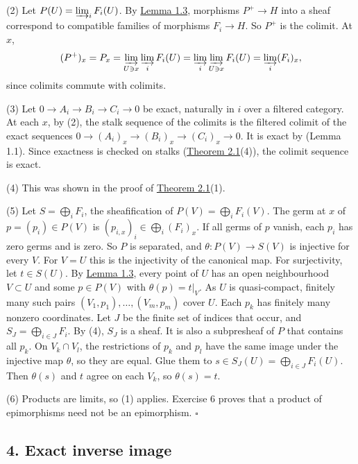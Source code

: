 \documentclass[
  english,
  11pt,
  a4paper,
]{article}
\begin{document}
(2) Let \(P(U)=\varinjlim_iF_i(U)\). By
\hyperref[sheaves-of-modules-on-a-ringed-space--sheafification-and-the-stalk-test]{Lemma
1.3}, morphisms \(P^+\to H\) into a sheaf correspond to compatible
families of morphisms \(F_i\to H\). So \(P^+\) is the colimit. At \(x\),
\[(P^+)_x=P_x=\varinjlim_{U\ni x}\varinjlim_iF_i(U)=\varinjlim_i\varinjlim_{U\ni x}F_i(U)=\varinjlim_i(F_i)_x ,\]
since colimits commute with colimits.

(3) Let \(0\to A_i\to B_i\to C_i\to0\) be exact, naturally in \(i\) over
a filtered category. At each \(x\), by (2), the stalk sequence of the
colimits is the filtered colimit of the exact sequences
\(0\to(A_i)_x\to(B_i)_x\to(C_i)_x\to0\). It is exact by (Lemma 1.1).
Since exactness is checked on stalks
(\hyperref[sheaves-of-modules-on-a-ringed-space--2-the-abelian-category-of-module-sheaves]{Theorem
2.1}(4)), the colimit sequence is exact.

(4) This was shown in the proof of
\hyperref[sheaves-of-modules-on-a-ringed-space--2-the-abelian-category-of-module-sheaves]{Theorem
2.1}(1).

(5) Let \(S=\bigoplus_iF_i\), the sheafification of
\(P(V)=\bigoplus_iF_i(V)\). The germ at \(x\) of \(p=(p_i)\in P(V)\) is
\((p_{i,x})_i\in\bigoplus_i(F_i)_x\). If all germs of \(p\) vanish, each
\(p_i\) has zero germs and is zero. So \(P\) is separated, and
\(\theta:P(V)\to S(V)\) is injective for every \(V\). For \(V=U\) this
is the injectivity of the canonical map. For surjectivity, let
\(t\in S(U)\). By
\hyperref[sheaves-of-modules-on-a-ringed-space--sheafification-and-the-stalk-test]{Lemma
1.3}, every point of \(U\) has an open neighbourhood \(V\subset U\) and
some \(p\in P(V)\) with \(\theta(p)=t|_V\). As \(U\) is quasi-compact,
finitely many such pairs \((V_1,p_1),\ldots,(V_m,p_m)\) cover \(U\).
Each \(p_k\) has finitely many nonzero coordinates. Let \(J\) be the
finite set of indices that occur, and \(S_J=\bigoplus_{i\in J}F_i\). By
(4), \(S_J\) is a sheaf. It is also a subpresheaf of \(P\) that contains
all \(p_k\). On \(V_k\cap V_l\), the restrictions of \(p_k\) and \(p_l\)
have the same image under the injective map \(\theta\), so they are
equal. Glue them to \(s\in S_J(U)=\bigoplus_{i\in J}F_i(U)\). Then
\(\theta(s)\) and \(t\) agree on each \(V_k\), so \(\theta(s)=t\).

(6) Products are limits, so (1) applies. Exercise 6 proves that a
product of epimorphisms need not be an epimorphism. \(\square\)

\subsection{4. Exact inverse
image}\label{sheaves-of-modules-on-a-ringed-space--4-exact-inverse-image}
\end{document}
